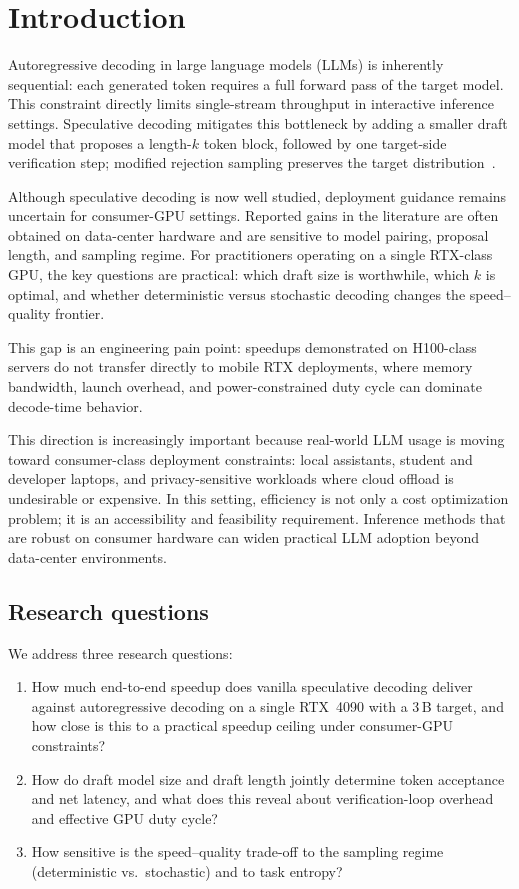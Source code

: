 \section{Introduction}

Autoregressive decoding in large language models (LLMs) is inherently
sequential: each generated token requires a full forward pass of the target
model. This constraint directly limits single-stream throughput in interactive
inference settings. Speculative decoding mitigates this bottleneck by adding a
smaller draft model that proposes a length-$k$ token block, followed by one
target-side verification step; modified rejection sampling preserves the target
distribution~\cite{Leviathan2023,Chen2023specsampling}.

Although speculative decoding is now well studied, deployment guidance remains
uncertain for consumer-GPU settings. Reported gains in the literature are often
obtained on data-center hardware and are sensitive to model pairing, proposal
length, and sampling regime. For practitioners operating on a single RTX-class
GPU, the key questions are practical: which draft size is worthwhile, which
$k$ is optimal, and whether deterministic versus stochastic decoding changes
the speed--quality frontier.

This gap is an engineering pain point: speedups demonstrated on H100-class
servers do not transfer directly to mobile RTX deployments, where memory
bandwidth, launch overhead, and power-constrained duty cycle can dominate
decode-time behavior.

This direction is increasingly important because real-world LLM usage is moving
toward consumer-class deployment constraints: local assistants, student and
developer laptops, and privacy-sensitive workloads where cloud offload is
undesirable or expensive. In this setting, efficiency is not only a cost
optimization problem; it is an accessibility and feasibility requirement.
Inference methods that are robust on consumer hardware can widen practical LLM
adoption beyond data-center environments.

\subsection{Research questions}
\label{sec:rqs}

We address three research questions:
\begin{enumerate}\itemsep0pt
  \item[\textbf{RQ1.}] How much end-to-end speedup does vanilla
        speculative decoding deliver against autoregressive decoding on a
        single RTX~4090 with a 3\,B target, and how close is this to
        a practical speedup ceiling under consumer-GPU constraints?
  \item[\textbf{RQ2.}] How do draft model size and draft length jointly
        determine token acceptance and net latency, and what does this reveal
        about verification-loop overhead and effective GPU duty cycle?
  \item[\textbf{RQ3.}] How sensitive is the speed--quality trade-off to
        the sampling regime (deterministic vs.\ stochastic) and to task
        entropy?
\end{enumerate}

